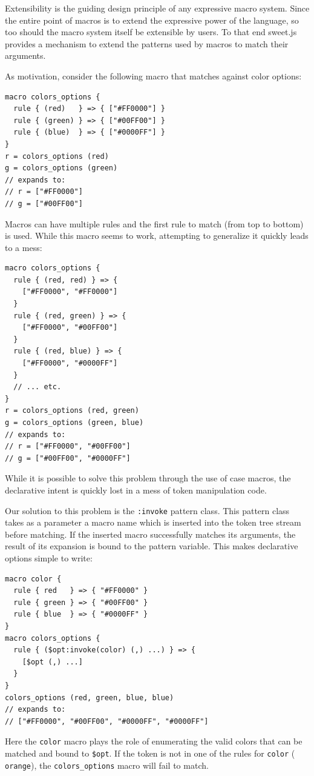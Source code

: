 \documentclass[preprint,10pt]{sigplanconf}
\begin{document}
Extensibility is the guiding design principle of any expressive macro
system. Since the entire point of macros is to extend the expressive
power of the language, so too should the macro system itself be
extensible by users. To that end sweet.js provides a mechanism to
extend the patterns used by macros to match their arguments.

As motivation, consider the following macro that matches against
color options:
\begin{lstlisting}
macro colors_options {
  rule { (red)   } => { ["#FF0000"] }
  rule { (green) } => { ["#00FF00"] }
  rule { (blue)  } => { ["#0000FF"] }
}
r = colors_options (red)
g = colors_options (green)
// expands to:
// r = ["#FF0000"]
// g = ["#00FF00"]
\end{lstlisting}
Macros can have multiple rules and the first rule to match (from top
to bottom) is used. While this macro seems to work, attempting to
generalize it quickly leads to a mess:
\begin{lstlisting}
macro colors_options {
  rule { (red, red) } => {
    ["#FF0000", "#FF0000"]
  }
  rule { (red, green) } => {
    ["#FF0000", "#00FF00"]
  }
  rule { (red, blue) } => {
    ["#FF0000", "#0000FF"]
  }
  // ... etc.
}
r = colors_options (red, green)
g = colors_options (green, blue)
// expands to:
// r = ["#FF0000", "#00FF00"]
// g = ["#00FF00", "#0000FF"]
\end{lstlisting}
While it is possible to solve this problem through the use of case
macros, the declarative intent is quickly lost in a mess of 
token manipulation code.

Our solution to this problem is the \verb!:invoke! pattern class.
This pattern class takes as a parameter a macro name which is inserted
into the token tree stream before matching. If the inserted macro
successfully matches its arguments, the result of its expansion is
bound to the pattern variable. This makes declarative options simple
to write:
\begin{lstlisting}
macro color {
  rule { red   } => { "#FF0000" }
  rule { green } => { "#00FF00" }
  rule { blue  } => { "#0000FF" }
}
macro colors_options {
  rule { ($opt:invoke(color) (,) ...) } => { 
    [$opt (,) ...]
  }
}
colors_options (red, green, blue, blue)
// expands to:
// ["#FF0000", "#00FF00", "#0000FF", "#0000FF"]
\end{lstlisting}
Here the \verb!color! macro plays the role of enumerating the
valid colors that can be matched and bound to \verb!$opt!.
If the token is not in one of the rules for \verb!color! (\eg
\verb!orange!), the \verb!colors_options! macro will fail to match.
\end{document}
